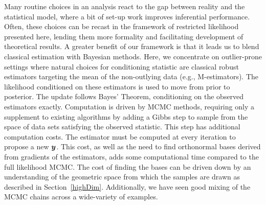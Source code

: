 \documentclass[ba]{imsart}
\newcommand{\by}{\mbox{\boldmath $y$}}
\begin{document}
Many routine choices in an analysis react to the gap between reality and the
statistical model, where a bit of set-up work improves inferential
performance.  Often, these choices can be recast in the framework of
restricted likelihood presented here, lending them more formality and facilitating
development of theoretical results. A greater benefit of our framework is that it leads us to blend classical estimation with
Bayesian methods. Here, we concentrate on outlier-prone settings where natural choices for conditioning statistic are classical robust estimators targeting the mean of the non-outlying data (e.g., M-estimators).  The likelihood conditioned on these estimators is used to move from prior to posterior. The update follows Bayes' Theorem, conditioning on the observed estimators exactly.   Computation is driven by MCMC methods, requiring only a supplement to existing algorithms by adding a Gibbs step to sample from the space of data sets satisfying the observed statistic. This step has additional computation costs. The estimator must be computed at every iteration to propose a new $\by$. This cost, as well as the need to find orthonormal bases derived from gradients of the estimators, adds some computational time compared to the full likelihood MCMC. The cost of finding the bases can be driven down by an understanding of the geometric space from which the samples are drawn as described in Section~\ref{highDim}. Additionally, we have seen good mixing of the MCMC chains across a wide-variety of examples. 
\end{document}
